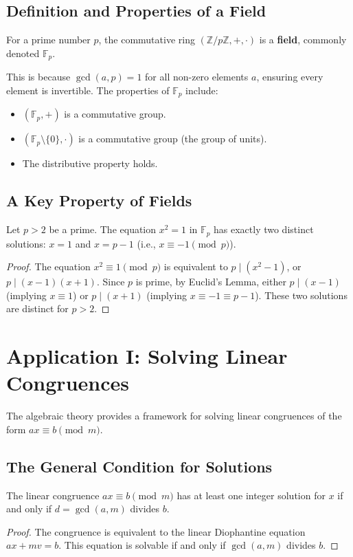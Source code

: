 \subsection{Definition and Properties of a Field}
\begin{proposition}
For a prime number $p$, the commutative ring $(\mathbb{Z}/p\mathbb{Z}, +, \cdot)$ is a \textbf{field}, commonly denoted $\mathbb{F}_p$.
\end{proposition}
This is because $\gcd(a, p) = 1$ for all non-zero elements $a$, ensuring every element is invertible. The properties of $\mathbb{F}_p$ include:
\begin{itemize}
    \item $(\mathbb{F}_p, +)$ is a commutative group.
    \item $(\mathbb{F}_p \setminus \{0\}, \cdot)$ is a commutative group (the group of units).
    \item The distributive property holds.
\end{itemize}

\subsection{A Key Property of Fields}
\begin{corollary}
Let $p > 2$ be a prime. The equation $x^2 = 1$ in $\mathbb{F}_p$ has exactly two distinct solutions: $x = 1$ and $x = p-1$ (i.e., $x \equiv -1 \pmod{p}$).
\end{corollary}
\begin{proof}
The equation $x^2 \equiv 1 \pmod{p}$ is equivalent to $p \mid (x^2 - 1)$, or $p \mid (x - 1)(x + 1)$. Since $p$ is prime, by Euclid's Lemma, either $p \mid (x - 1)$ (implying $x \equiv 1$) or $p \mid (x + 1)$ (implying $x \equiv -1 \equiv p-1$). These two solutions are distinct for $p > 2$.
\end{proof}

\section{Application I: Solving Linear Congruences}
The algebraic theory provides a framework for solving linear congruences of the form $ax \equiv b \pmod{m}$.

\subsection{The General Condition for Solutions}
\begin{proposition}
The linear congruence $ax \equiv b \pmod{m}$ has at least one integer solution for $x$ if and only if $d = \gcd(a, m)$ divides $b$.
\end{proposition}
\begin{proof}
The congruence is equivalent to the linear Diophantine equation $ax + mv = b$. This equation is solvable if and only if $\gcd(a, m)$ divides $b$.
\end{proof}

